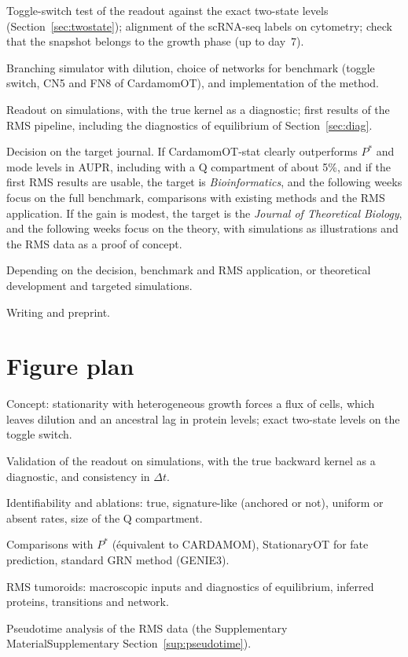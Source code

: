 \documentclass[a4paper, 11pt]{article}
\newcommand{\cQ}{\mathrm{Q}}
\newcommand{\supref}[1]{\ifsimplified the Supplementary Material\else Supplementary Section~\ref{#1}\fi}
\theoremstyle{plain}
\theoremstyle{remark}
\begin{document}
\begin{description}[style=nextline, leftmargin=2cm]
\item[Weeks 1--2] Toggle-switch test of the readout against the exact two-state levels (Section~\ref{sec:twostate}); alignment of the scRNA-seq labels on cytometry; check that the snapshot belongs to the growth phase (up to day~7).
\item[Weeks 1--5] Branching simulator with dilution, choice of networks for benchmark (toggle switch, CN5 and FN8 of CardamomOT), and implementation of the method.
\item[Weeks 4--8] Readout on simulations, with the true kernel as a diagnostic; first results of the RMS pipeline, including the diagnostics of equilibrium of Section~\ref{sec:diag}.
\item[Week 8] Decision on the target journal. If CardamomOT-stat clearly outperforms $P^\ast$ and mode levels in AUPR, including with a $\cQ$ compartment of about 5\%, and if the first RMS results are usable, the target is \emph{Bioinformatics}, and the following weeks focus on the full benchmark, comparisons with existing methods and the RMS application. If the gain is modest, the target is the \emph{Journal of Theoretical Biology}, and the following weeks focus on the theory, with simulations as illustrations and the RMS data as a proof of concept.
\item[Weeks 8--14] Depending on the decision, benchmark and RMS application, or theoretical development and targeted simulations.
\item[Weeks 14--18] Writing and preprint.
\end{description}

\section{Figure plan}\label{sec:figures}

\begin{description}[style=nextline, leftmargin=2cm]
\item[Figure 1] Concept: stationarity with heterogeneous growth forces a flux of cells, which leaves dilution and an ancestral lag in protein levels; exact two-state levels on the toggle switch.
\item[Figure 2] Validation of the readout on simulations, with the true backward kernel as a diagnostic, and consistency in $\Delta t$.
\item[Figure 3] Identifiability and ablations: true, signature-like (anchored or not), uniform or absent rates, size of the $\cQ$ compartment.
\item[Figure 4] Comparisons with $P^\ast$ (équivalent to CARDAMOM), StationaryOT for fate prediction, standard GRN method (GENIE3).
\item[Figures 5--6] RMS tumoroids: macroscopic inputs and diagnostics of equilibrium, inferred proteins, transitions and network.
\item[Supplementary] Pseudotime analysis of the RMS data (\supref{sup:pseudotime}).
\end{description}
\end{document}
